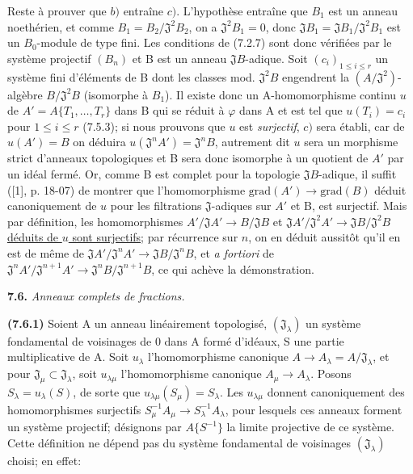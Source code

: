 Reste à prouver que $b)$ entraîne $c)$. L'hypothèse entraîne que $B_1$ est un anneau noethérien, et comme $B_1=B_2/\mathfrak J^2B_2$, on a $\mathfrak J^2B_1=0$, donc $\mathfrak JB_1=\mathfrak JB_1/\mathfrak J^2B_1$ est un $B_0$-module de type fini. Les conditions de (7.2.7) sont donc vérifiées par le système projectif $(B_n)$ et B est un anneau $\mathfrak JB$-adique. Soit $(c_i)_{1\leq i\leq r}$ un système fini d'éléments de B dont les classes mod. $\mathfrak J^2B$ engendrent la $(A/\mathfrak J^2)$-algèbre $B/\mathfrak J^2B$ (isomorphe à $B_1$).
Il existe donc un A-homomorphisme continu $u$ de $A'=A\{T_1,\ldots,T_r\}$ dans B qui se réduit à $\varphi$ dans A et est tel que $u(T_i)=c_i$ pour $1\leq i\leq r$ (7.5.3); si nous prouvons que $u$ est \textit{surjectif}, $c)$ sera établi, car de $u(A')=B$ on déduira $u(\mathfrak J^nA')=\mathfrak J^nB$, autrement dit $u$ sera un morphisme strict d'anneaux topologiques et B sera donc isomorphe à un quotient de $A'$ par un idéal fermé. Or, comme B est complet pour la topologie $\mathfrak JB$-adique, il suffit ([1], p. 18-07) de montrer que l'homomorphisme $\mathrm{grad}(A')\to\mathrm{grad}(B)$ déduit canoniquement de $u$ pour les filtrations $\mathfrak J$-adiques sur $A'$ et B, est surjectif. Mais par définition, les homomorphismes $A'/\mathfrak JA'\to B/\mathfrak JB$ et \uline{$\mathfrak JA'/\mathfrak J^2A'\to\mathfrak JB/\mathfrak J^2B$ déduits de $u$ sont surjectifs}; par récurrence sur $n$, on en déduit aussitôt qu'il en est de même de $\mathfrak JA'/\mathfrak J^nA'\to\mathfrak JB/\mathfrak J^nB$, et \textit{a fortiori} de $\mathfrak J^nA'/\mathfrak J^{n+1}A'\to\mathfrak J^nB/\mathfrak J^{n+1}B$, ce qui achève la démonstration.
\margin{!}

\textbf{7.6.} \textit{Anneaux complets de fractions.}

\textbf{(7.6.1)} Soient A un anneau linéairement topologisé, $(\mathfrak J_\lambda)$ un système fondamental de voisinages de 0 dans A formé d'idéaux, S une partie multiplicative de A. Soit $u_\lambda$ l'homomorphisme canonique $A\to A_\lambda=A/\mathfrak J_\lambda$, et pour $\mathfrak J_\mu\subset\mathfrak J_\lambda$, soit $u_{\lambda\mu}$ l'homomorphisme canonique $A_\mu\to A_\lambda$. Posons $S_\lambda=u_\lambda(S)$, de sorte que $u_{\lambda\mu}(S_\mu)=S_\lambda$. Les $u_{\lambda\mu}$ donnent canoniquement des homomorphismes surjectifs $S_\mu^{-1}A_\mu\to S_\lambda^{-1}A_\lambda$, pour lesquels ces anneaux forment un système projectif; désignons par $A\{S^{-1}\}$ la limite projective de ce système. Cette définition ne dépend pas du système fondamental de voisinages $(\mathfrak J_\lambda)$ choisi; en effet:

